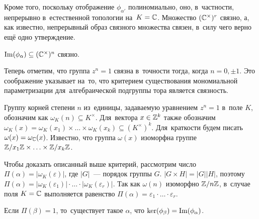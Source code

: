 \documentclass[a4paper,oneside]{article}
\begin{document}
Кроме того, поскольку отображение $\phi_{\alpha'}$ полиномиально, оно, в~частности, непрерывно в~естественной топологии на~$K = \mathbb{C}$.
Множество $(\mathbb{C}^\times)^r$ связно, а, как известно, непрерывный образ связного множества связен, в~силу чего верно ещё одно утверждение.

\begin{statement*}
  $\mathrm{Im}(\phi_\alpha) \subseteq (\mathbb{C}^\times)^n$ связно.
\end{statement*}

Теперь отметим, что группа $z^n = 1$ связна в~точности тогда, когда $n = 0, \pm 1$.
Это соображение указывает на~то, что критерием существования мономиальной параметризации
для~алгебраической подгруппы тора является связность.

Группу корней степени $n$ из~единицы, задаваемую уравнением $z^n = 1$ в~поле $K$, обозначим как $\omega_K(n) \subseteq K^\times$.
Для~вектора $x \in \mathbb{Z}^k$ также обозначим $\omega_K(x) = \omega_K(x_1) \times \ldots \times \omega_K(x_k) \subseteq (K^\times)^k$.
Для~краткости будем писать $\omega(x) = \omega_{\mathbb{C}}(x)$. Известно, что группа $\omega(x)$ изоморфна
группе $\mathbb{Z} / x_1 \mathbb{Z} \times \ldots \times \mathbb{Z} / x_k \mathbb{Z}$.

Чтобы доказать описанный выше критерий, рассмотрим число $\Pi(\alpha) = |\omega_K(\varepsilon)|$, где $|G|$~— порядок группы $G$.
$|G \times H| = |G| |H|$, поэтому $\Pi(\alpha) = |\omega_K(\varepsilon_1)| \cdot \ldots \cdot |\omega_K(\varepsilon_r)|$.
Так как $\omega(n)$ изоморфно $\mathbb{Z} / n \mathbb{Z}$, в~случае поля $K = \mathbb{C}$ выполняется
равенство $\Pi(\alpha) = \varepsilon_1 \cdot \ldots \cdot \varepsilon_r$.

\begin{lemma}
\label{lemma:exactOutOfPi}
  Если $\Pi(\beta) = 1$, то~существует такое $\alpha$, что $\ker(\phi_\beta) = \mathrm{Im}(\phi_\alpha)$.
\end{lemma}
\end{document}
